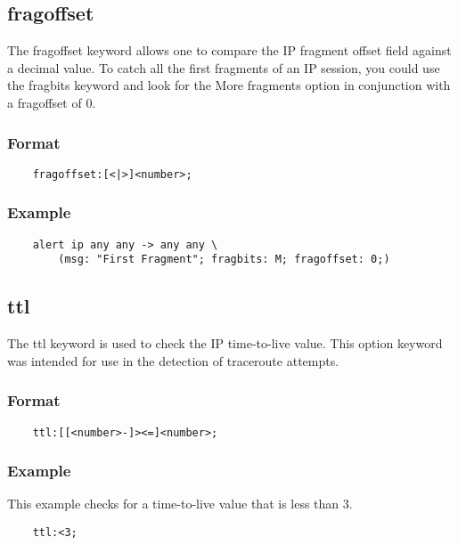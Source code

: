 \documentclass[english]{report}
\begin{document}
\subsection{fragoffset}
\label{fragoffset section}

The fragoffset keyword allows one to compare the IP fragment offset field
against a decimal value. To catch all the first fragments of an IP session, you
could use the fragbits keyword and look for the More fragments option in
conjunction with a fragoffset of 0.

\subsubsection{Format}

\begin{verbatim}
    fragoffset:[<|>]<number>;
\end{verbatim}

\subsubsection{Example}

\begin{verbatim}
    alert ip any any -> any any \
        (msg: "First Fragment"; fragbits: M; fragoffset: 0;)
\end{verbatim}

\subsection{ttl}

The ttl keyword is used to check the IP time-to-live value.  This option
keyword was intended for use in the detection of traceroute attempts.

\subsubsection{Format}

\begin{verbatim}
    ttl:[[<number>-]><=]<number>;
\end{verbatim}

\subsubsection{Example}

This example checks for a time-to-live value that is less than 3.

\begin{verbatim}
    ttl:<3;
\end{verbatim}
\end{document}
